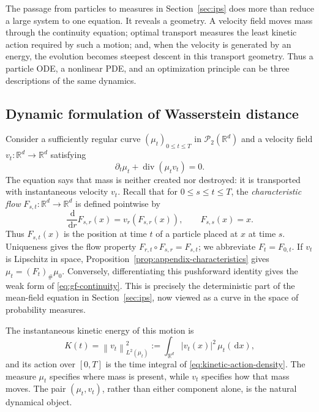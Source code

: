 \documentclass[11pt]{amsart}
\numberwithin{equation}{section}
\theoremstyle{plain}
\newcommand{\R}{\mathbb{R}}
\newcommand{\cP}{\mathcal{P}}
\newcommand{\dd}{\,\mathrm{d}}
\newcommand{\abs}[1]{\left\lvert#1\right\rvert}
\newcommand{\norm}[1]{\left\lVert#1\right\rVert}
\DeclareMathOperator{\diver}{div}
\begin{document}
The passage from particles to measures in Section~\ref{sec:ips} does more than reduce a large system to one equation.  It reveals a geometry.  A velocity
field moves mass through the continuity equation; optimal transport measures
the least kinetic action required by such a motion; and, when the velocity is
generated by an energy, the evolution becomes steepest descent in this
transport geometry.  Thus a particle ODE, a nonlinear PDE, and an optimization
principle can be three descriptions of the same dynamics.

\subsection{Dynamic formulation of Wasserstein distance}

Consider a sufficiently regular curve $(\mu_t)_{0\leq t\leq T}$ in
$\cP_2(\R^d)$ and a velocity field $v_t:\R^d\to\R^d$ satisfying
\begin{equation}\label{eq:gf-continuity}
 \partial_t\mu_t+\diver(\mu_t v_t)=0.
\end{equation}
The equation says that mass is neither created nor destroyed: it is transported
with instantaneous velocity $v_t$.
Recall that for $0\leq s\leq t\leq T$, the \emph{characteristic flow}
$F_{s,t}:\R^d\to\R^d$ is defined pointwise by
\[
 \frac{\dd}{\dd r}F_{s,r}(x)=v_r(F_{s,r}(x)),\qquad F_{s,s}(x)=x.
\]
Thus $F_{s,t}(x)$ is the position at time $t$ of a particle placed at $x$ at
time $s$.  Uniqueness gives the flow property
$F_{r,t}\circ F_{s,r}=F_{s,t}$; we abbreviate $F_t=F_{0,t}$.
If $v_t$ is Lipschitz in space, Proposition~\ref{prop:appendix-characteristics}
gives $\mu_t=(F_t)_\#\mu_0$.  Conversely, differentiating this pushforward
identity gives the weak form of \eqref{eq:gf-continuity}.  This is precisely
the deterministic part of the mean-field equation in
Section~\ref{sec:ips}, now viewed as
a curve in the space of probability measures.

The instantaneous kinetic energy of this motion is
\begin{equation}\label{eq:kinetic-action-density}
 K(t)= \norm{v_t}_{L^2(\mu_t)}^2
 :=\int_{\R^d}\abs{v_t(x)}^2\,\mu_t(\dd x),
\end{equation}
and its action over $[0,T]$ is the time integral of
\eqref{eq:kinetic-action-density}.  The measure $\mu_t$ specifies where mass
is present, while $v_t$ specifies how that mass moves.  The pair
$(\mu_t,v_t)$, rather than either component alone, is the natural dynamical
object.
\end{document}
